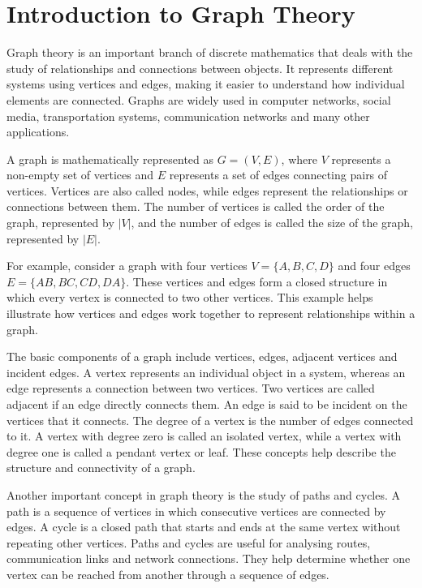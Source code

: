 \documentclass[12pt,a4paper]{article}
\begin{document}


\tableofcontents
\newpage

\setcounter{page}{1}

\section{Introduction to Graph Theory}

Graph theory is an important branch of discrete mathematics
that deals with the study of relationships and connections
between objects. It represents different systems using
vertices and edges, making it easier to understand how
individual elements are connected. Graphs are widely used
in computer networks, social media, transportation systems,
communication networks and many other applications.

A graph is mathematically represented as $G = (V,E)$,
where $V$ represents a non-empty set of vertices and
$E$ represents a set of edges connecting pairs of vertices.
Vertices are also called nodes, while edges represent the
relationships or connections between them. The number of
vertices is called the order of the graph, represented by
$|V|$, and the number of edges is called the size of the
graph, represented by $|E|$.

For example, consider a graph with four vertices
$V = \{A,B,C,D\}$ and four edges
$E = \{AB,BC,CD,DA\}$. These vertices and edges form
a closed structure in which every vertex is connected
to two other vertices. This example helps illustrate how
vertices and edges work together to represent relationships
within a graph.

The basic components of a graph include vertices, edges,
adjacent vertices and incident edges. A vertex represents
an individual object in a system, whereas an edge represents
a connection between two vertices. Two vertices are called
adjacent if an edge directly connects them. An edge is said
to be incident on the vertices that it connects. The degree
of a vertex is the number of edges connected to it. A vertex
with degree zero is called an isolated vertex, while a vertex
with degree one is called a pendant vertex or leaf. These
concepts help describe the structure and connectivity of
a graph.

Another important concept in graph theory is the study of
paths and cycles. A path is a sequence of vertices in which
consecutive vertices are connected by edges. A cycle is a
closed path that starts and ends at the same vertex without
repeating other vertices. Paths and cycles are useful for
analysing routes, communication links and network connections.
They help determine whether one vertex can be reached from
another through a sequence of edges.
\end{document}
